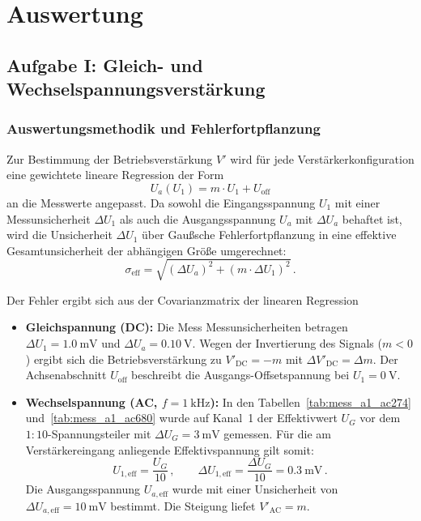 \documentclass[12pt,a4paper,titlepage]{scrartcl}
\numberwithin{equation}{section}
\numberwithin{table}{section}
\numberwithin{figure}{section}
\begin{document}


\clearpage


\section{Auswertung}\label{sec:Auswertung}

\subsection{Aufgabe I: Gleich- und Wechselspannungsverstärkung}\label{sec:Aufgabe1}

\subsubsection{Auswertungsmethodik und Fehlerfortpflanzung}

Zur Bestimmung der Betriebsverstärkung $V'$ wird für jede Verstärkerkonfiguration eine gewichtete lineare Regression der Form
\begin{equation}
    U_a(U_1) = m \cdot U_1 + U_{\text{off}}
    \label{eq:lin_reg}
\end{equation}
an die Messwerte angepasst. Da sowohl die Eingangsspannung $U_1$ mit einer Messunsicherheit $\Delta U_1$ als auch die Ausgangsspannung $U_a$ mit $\Delta U_a$ behaftet ist, wird die Unsicherheit $\Delta U_1$ über Gaußsche Fehlerfortpflanzung in eine effektive Gesamtunsicherheit der abhängigen Größe umgerechnet:
\begin{equation}
    \sigma_{\text{eff}} = \sqrt{(\Delta U_a)^2 + (m \cdot \Delta U_1)^2} \,.
    \label{eq:sigma_eff}
\end{equation}

Der Fehler ergibt sich aus der Covarianzmatrix der linearen Regression
\begin{itemize}
    \item \textbf{Gleichspannung (DC):} Die Mess Messunsicherheiten betragen $\Delta U_1 = \SI{1.0}{\milli\volt}$ und $\Delta U_a = \SI{0.10}{\volt}$. Wegen der Invertierung des Signals ($m < 0$) ergibt sich die Betriebsverstärkung zu $V'_{\text{DC}} = -m$ mit $\Delta V'_{\text{DC}} = \Delta m$. Der Achsenabschnitt $U_{\text{off}}$ beschreibt die Ausgangs-Offsetspannung bei $U_1 = \SI{0}{\volt}$.
    \item \textbf{Wechselspannung (AC, $f = \SI{1}{\kilo\hertz}$):} In den Tabellen~\ref{tab:mess_a1_ac274} und~\ref{tab:mess_a1_ac680} wurde auf Kanal~1 der Effektivwert $U_G$ vor dem $1{:}10$-Spannungsteiler mit $\Delta U_G = \SI{3}{\milli\volt}$ gemessen. Für die am Verstärkereingang anliegende Effektivspannung gilt somit:
    \begin{equation}
        U_{1,\text{eff}} = \frac{U_G}{10} \,, \qquad \Delta U_{1,\text{eff}} = \frac{\Delta U_G}{10} = \SI{0.3}{\milli\volt} \,.
    \end{equation}
    Die Ausgangsspannung $U_{a,\text{eff}}$ wurde mit einer Unsicherheit von $\Delta U_{a,\text{eff}} = \SI{10}{\milli\volt}$ bestimmt. Die Steigung liefet $V'_{\text{AC}} = m$.
\end{itemize}
\end{document}
